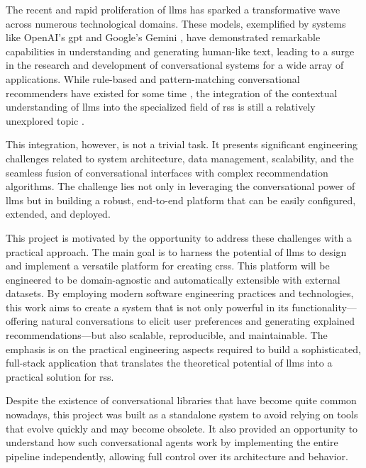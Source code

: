 The recent and rapid proliferation of \acp{llm} has sparked a transformative wave across numerous technological domains. These models, exemplified by systems like OpenAI's \ac{gpt} \cite{CHATGPT} and Google's Gemini \cite{GEMINI}, have demonstrated remarkable capabilities in understanding and generating human-like text, leading to a surge in the research and development of conversational systems for a wide array of applications. While rule-based and pattern-matching conversational recommenders have existed for some time \cite{SOTA-CRS}, the integration of the contextual understanding of \acp{llm} into the specialized field of \aclp{rs} is still a relatively unexplored topic \cite{SOTA-CRS-LLM}.

This integration, however, is not a trivial task. It presents significant engineering challenges related to system architecture, data management, scalability, and the seamless fusion of conversational interfaces with complex recommendation algorithms. The challenge lies not only in leveraging the conversational power of \acp{llm} but in building a robust, end-to-end platform that can be easily configured, extended, and deployed.

This project is motivated by the opportunity to address these challenges with a practical approach. The main goal is to harness the potential of \acp{llm} to design and implement a versatile platform for creating \acp{crs}. This platform will be engineered to be domain-agnostic and automatically extensible with external datasets. By employing modern software engineering practices and technologies, this work aims to create a system that is not only powerful in its functionality---offering natural conversations to elicit user preferences \cite[Conversational Preference Elicitation]{CHAPTER:RS-HANDBOOK-NLP} and generating explained recommendations---but also scalable, reproducible, and maintainable. The emphasis is on the practical engineering aspects required to build a sophisticated, full-stack application that translates the theoretical potential of \acp{llm} into a practical solution for \aclp{rs}.

Despite the existence of conversational libraries that have become quite common nowadays, this project was built as a standalone system to avoid relying on tools that evolve quickly and may become obsolete. It also provided an opportunity to understand how such conversational agents work by implementing the entire pipeline independently, allowing full control over its architecture and behavior.
